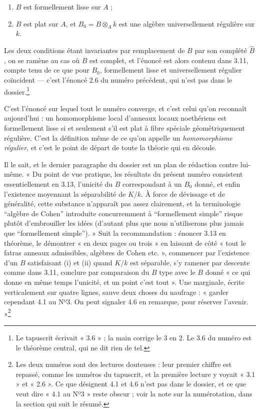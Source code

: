 \documentclass[11pt,a4paper]{article}
\begin{document}
\begin{enumerate}
  \item[(i)] $B$ est formellement lisse sur $A$ ;
  \item[(ii)] $B$ est plat sur $A$, et $B_0 = B \otimes_A k$ est une algèbre
  universellement régulière sur $k$.
\end{enumerate}

Les deux conditions étant invariantes par remplacement de $B$ par son complété
$\hat{B}$, on se ramène au cas où $B$ est complet, et l'énoncé est alors
contenu dans 3.11, compte tenu de ce que pour $B_0$, formellement lisse et
universellement régulier coïncident — c'est l'énoncé 2.6 du numéro précédent,
qui n'est pas dans le dossier.\footnote{Le tapuscrit écrivait « 3.6 » ; la main
corrige le $3$ en $2$. Le 3.6 du numéro est le théorème central, qui ne dit
rien de tel.}

C'est l'énoncé sur lequel tout le numéro converge, et c'est celui qu'on
reconnaît aujourd'hui : un homomorphisme local d'anneaux locaux noethériens est
formellement lisse si et seulement s'il est plat à fibre spéciale
géométriquement régulière. C'est la définition même de ce qu'on appelle un
\emph{homomorphisme régulier}, et c'est le point de départ de toute la théorie
qui en découle.

Il le sait, et le dernier paragraphe du dossier est un plan de rédaction contre
lui-même. « Du point de vue pratique, les résultats du présent numéro
consistent essentiellement en 3.13, l'unicité du $B$ correspondant à un $B_0$
donné, et enfin l'existence moyennant la séparabilité de $K/k$. À force de
dévissage et de généralité, cette substance n'apparaît pas assez clairement, et
la terminologie “algèbre de Cohen” introduite concurremment à “formellement
simple” risque plutôt d'embrouiller les idées (d'autant plus que nous
n'utiliserons plus jamais que “formellement simple”). » Suit la recommandation :
énoncer 3.13 en théorème, le démontrer « en deux pages ou trois » en laissant
de côté « tout le fatras anneaux admissibles, algèbres de Cohen etc. »,
commencer par l'existence d'un $B$ satisfaisant (i) et (ii) quand $K/k$ est
séparable, s'y ramener par descente comme dans 3.11, conclure par comparaison
du $B$ type avec le $B$ donné « ce qui donne en même temps l'unicité, et un
point c'est tout ». Une marginale, écrite verticalement sur quatre lignes,
sauve deux choses du naufrage : « garder cependant 4.1 au Nº3. On peut signaler
4.6 en remarque, pour réserver l'avenir. »\footnote{Les deux numéros sont des
lectures douteuses : leur premier chiffre est repassé, comme les numéros du
tapuscrit, et la première lecture y voyait « 3.1 » et « 2.6 ». Ce que
désignent 4.1 et 4.6 n'est pas dans le dossier, et ce que veut dire « 4.1 au
Nº3 » reste obscur ; voir la note sur la numérotation, dans la section qui
suit le résumé.}
\end{document}
